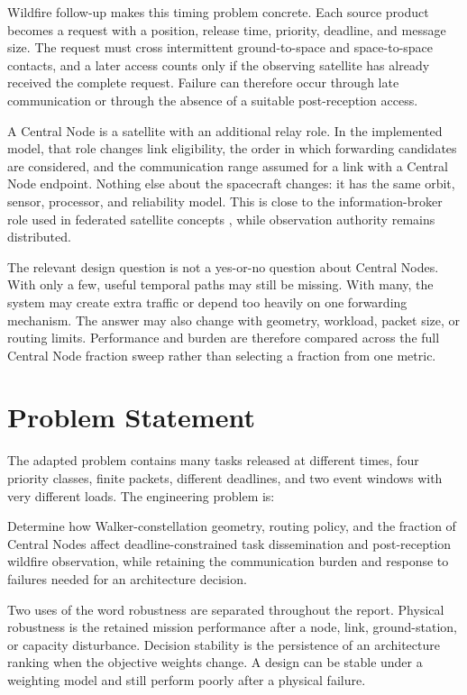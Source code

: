Wildfire follow-up makes this timing problem concrete. Each source product becomes a request with a position, release time, priority, deadline, and message size. The request must cross intermittent ground-to-space and space-to-space contacts, and a later access counts only if the observing satellite has already received the complete request. Failure can therefore occur through late communication or through the absence of a suitable post-reception access.

A Central Node is a satellite with an additional relay role. In the implemented model, that role changes link eligibility, the order in which forwarding candidates are considered, and the communication range assumed for a link with a Central Node endpoint. Nothing else about the spacecraft changes: it has the same orbit, sensor, processor, and reliability model. This is close to the information-broker role used in federated satellite concepts \citep{Scrocciolani2024,Messina2025}, while observation authority remains distributed.

The relevant design question is not a yes-or-no question about Central Nodes. With only a few, useful temporal paths may still be missing. With many, the system may create extra traffic or depend too heavily on one forwarding mechanism. The answer may also change with geometry, workload, packet size, or routing limits. Performance and burden are therefore compared across the full Central Node fraction sweep rather than selecting a fraction from one metric.

\section{Problem Statement}
The adapted problem contains many tasks released at different times, four priority classes, finite packets, different deadlines, and two event windows with very different loads. The engineering problem is:

Determine how Walker-constellation geometry, routing policy, and the fraction of Central Nodes affect deadline-constrained task dissemination and post-reception wildfire observation, while retaining the communication burden and response to failures needed for an architecture decision.

Two uses of the word robustness are separated throughout the report. Physical robustness is the retained mission performance after a node, link, ground-station, or capacity disturbance. Decision stability is the persistence of an architecture ranking when the objective weights change. A design can be stable under a weighting model and still perform poorly after a physical failure.


